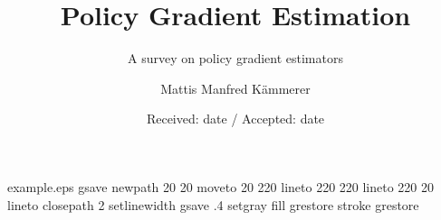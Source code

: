 \begin{filecontents*}{example.eps}
gsave
newpath
  20 20 moveto
  20 220 lineto
  220 220 lineto
  220 20 lineto
closepath
2 setlinewidth
gsave
  .4 setgray fill
grestore
stroke
grestore
\end{filecontents*}
\RequirePackage{fix-cm}
\documentclass[draft]{svjour3}
\smartqed
\usepackage[T1]{fontenc}
\usepackage[utf8]{inputenc}
\usepackage[final]{graphicx}
\graphicspath{ {./images/} }
\usepackage{amsmath,amssymb}
\usepackage[final]{hyperref}
\usepackage{tikz}
\usepackage{environ}
\usetikzlibrary{shapes,arrows,positioning,calc}


\title{Policy Gradient Estimation}
\subtitle{A survey on policy gradient estimators}

\author {Mattis Manfred K{\"a}mmerer}


\date{Received: date / Accepted: date}

\maketitle

\begin{abstract}

The goal of policy gradient approaches is to find a policy in a given class of policies which maximizes the expected return.
Given a differentiale model of the policy, e.g. exponential policies, we want to apply a gradient-ascent technique to reach the local optimum. 
The main issue is that the policy gradient with respect to the expected return is not available, and we need to estimate it.
Gradient ascent has strong guarantees on convergence, and is theoretically well researched.
However, the main weakness of policy gradient algorithms is sample efficiency, as they tend to require on-policy data, and conservative learning rates.
Thus, most research is focused on finding algorithms with improved sample efficiency.
This paper provides a deep introduction to policy gradient that shows the development of policy gradient approaches, and should enable the reader to understand current research in the area. 

\end{abstract}

\section{Introduction}
\label{intro}

